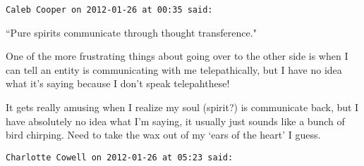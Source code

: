 \begin{footnotesize}\begin{sffamily}



\texttt{Caleb Cooper on 2012-01-26 at 00:35 said: }

``Pure spirits communicate through thought transference."

One of the more frustrating things about going over to the other side is when I can tell an entity is communicating with me telepathically, but I have no idea what it's saying because I don't speak telepahthese! 

It gets really amusing when I realize my soul (spirit?) is communicate back, but I have absolutely no idea what I'm saying, it usually just sounds like a bunch of bird chirping. Need to take the wax out of my `ears of the heart' I guess.


\hfill

\texttt{Charlotte Cowell on 2012-01-26 at 05:23 said: }


\end{sffamily}
\end{footnotesize}
